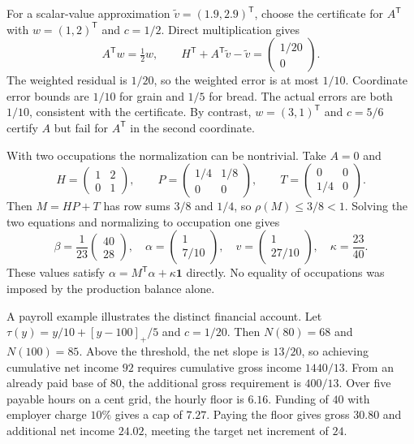 \documentclass[11pt,a4paper]{article}
\begin{document}
For a scalar-value approximation $\widetilde v=(1.9,2.9)^{\mathsf T}$, choose the certificate for $A^{\mathsf T}$ with $w=(1,2)^{\mathsf T}$ and $c=1/2$. Direct multiplication gives
\begin{equation}
A^{\mathsf T}w=\tfrac12w,\qquad
H^{\mathsf T}+A^{\mathsf T}\widetilde v-\widetilde v
=\begin{pmatrix}1/20\\0\end{pmatrix}.
\end{equation}
The weighted residual is $1/20$, so the weighted error is at most $1/10$. Coordinate error bounds are $1/10$ for grain and $1/5$ for bread. The actual errors are both $1/10$, consistent with the certificate. By contrast, $w=(3,1)^{\mathsf T}$ and $c=5/6$ certify $A$ but fail for $A^{\mathsf T}$ in the second coordinate.

With two occupations the normalization can be nontrivial. Take $A=0$ and
\begin{equation}
H=\begin{pmatrix}1&2\\0&1\end{pmatrix},\qquad
P=\begin{pmatrix}1/4&1/8\\0&0\end{pmatrix},\qquad
T=\begin{pmatrix}0&0\\1/4&0\end{pmatrix}.
\end{equation}
Then $M=HP+T$ has row sums $3/8$ and $1/4$, so $\rho(M)\leq3/8<1$. Solving the two equations and normalizing to occupation one gives
\begin{equation}
\beta=\frac1{23}\begin{pmatrix}40\\28\end{pmatrix},\quad
\alpha=\begin{pmatrix}1\\7/10\end{pmatrix},\quad
v=\begin{pmatrix}1\\27/10\end{pmatrix},\quad \kappa=\frac{23}{40}.
\end{equation}
These values satisfy $\alpha=M^{\mathsf T}\alpha+\kappa\mathbf1$ directly. No equality of occupations was imposed by the production balance alone.

A payroll example illustrates the distinct financial account. Let $\tau(y)=y/10+[y-100]_+/5$ and $c=1/20$. Then $N(80)=68$ and $N(100)=85$. Above the threshold, the net slope is $13/20$, so achieving cumulative net income $92$ requires cumulative gross income $1440/13$. From an already paid base of $80$, the additional gross requirement is $400/13$. Over five payable hours on a cent grid, the hourly floor is $6.16$. Funding of $40$ with employer charge $10\%$ gives a cap of $7.27$. Paying the floor gives gross $30.80$ and additional net income $24.02$, meeting the target net increment of $24$.
\end{document}
